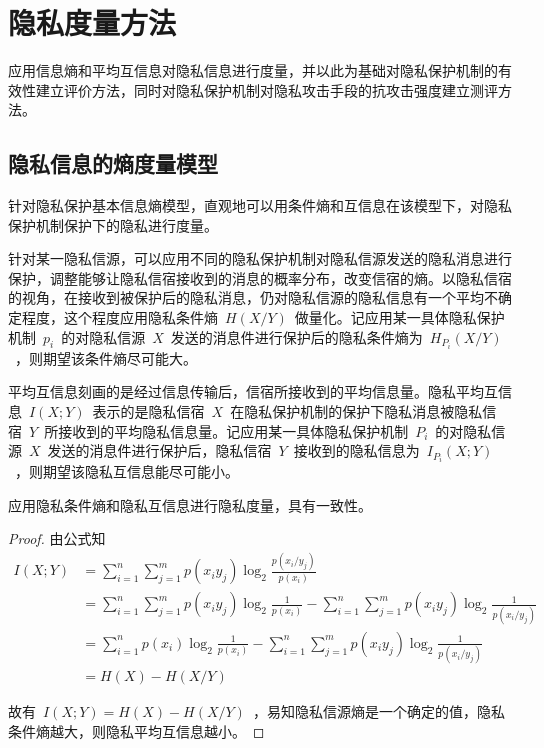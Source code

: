 \section{隐私度量方法}\label{Privacy measures}
应用信息熵和平均互信息对隐私信息进行度量，并以此为基础对隐私保护机制的有效性建立评价方法，同时对隐私保护机制对隐私攻击手段的抗攻击强度建立测评方法。

\subsection{隐私信息的熵度量模型}

针对隐私保护基本信息熵模型，直观地可以用条件熵和互信息在该模型下，对隐私保护机制保护下的隐私进行度量。

针对某一隐私信源，可以应用不同的隐私保护机制对隐私信源发送的隐私消息进行保护，调整能够让隐私信宿接收到的消息的概率分布，改变信宿的熵。以隐私信宿的视角，在接收到被保护后的隐私消息，仍对隐私信源的隐私信息有一个平均不确定程度，这个程度应用隐私条件熵~$H(X/Y)$~做量化。记应用某一具体隐私保护机制~$p_{i}$~的对隐私信源~$X$~发送的消息件进行保护后的隐私条件熵为~$H_{P_{i}}(X/Y)$~，则期望该条件熵尽可能大。

平均互信息刻画的是经过信息传输后，信宿所接收到的平均信息量。隐私平均互信息~$I(X;Y)$~表示的是隐私信宿~$X$~在隐私保护机制的保护下隐私消息被隐私信宿~$Y$~所接收到的平均隐私信息量。记应用某一具体隐私保护机制~$P_{i}$~的对隐私信源~$X$~发送的消息件进行保护后，隐私信宿~$Y$~接收到的隐私信息为~$I_{P_{i}}(X;Y)$~，则期望该隐私互信息能尽可能小。

\begin{property}
应用隐私条件熵和隐私互信息进行隐私度量，具有一致性。
\end{property}
\begin{proof}
	由公式知
	\begin{equation}
	\begin{split}
	I(X;Y)&=\sum_{i=1}^{n}\sum_{j=1}^{m}p(x_{i}y_{j})\log_{2}\frac{p(x_{i}/y_{j})}{p(x_{i})}\\
	&=\sum_{i=1}^{n}\sum_{j=1}^{m}p(x_{i}y_{j})\log_{2}\frac{1}{p(x_{i})}-\sum_{i=1}^{n}\sum_{j=1}^{m}p(x_{i}y_{j})\log_{2}\frac{1}{p(x_{i}/y_{j})}\\
	&=\sum_{i=1}^{n}p(x_{i})\log_{2}\frac{1}{p(x_{i})}-\sum_{i=1}^{n}\sum_{j=1}^{m}p(x_{i}y_{j})\log_{2}\frac{1}{p(x_{i}/y_{j})}\\
	&=H(X)-H(X/Y)
	\end{split}
	\end{equation}
	
	故有~$I(X;Y)=H(X)-H(X/Y)$~，易知隐私信源熵是一个确定的值，隐私条件熵越大，则隐私平均互信息越小。
\end{proof}


